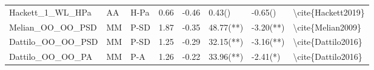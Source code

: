 \begin{tabular}{lllrrlll}
Hackett\_1\_WL\_HPa   &   AA &  H-Pa &              0.66 & -0.46 &                   0.43() &    -0.65() &    \textbackslash cite\{Hackett2019\} \\
Melian\_OO\_OO\_PSD   &   MM &  P-SD &              1.87 & -0.35 &                48.77(**) &  -3.20(**) &     \textbackslash cite\{Melian2009\} \\
Dattilo\_OO\_OO\_PSD  &   MM &  P-SD &              1.25 & -0.29 &                32.15(**) &  -3.16(**) &    \textbackslash cite\{Dattilo2016\} \\
Dattilo\_OO\_OO\_PA   &   MM &   P-A &              1.26 & -0.22 &                33.96(**) &   -2.41(*) &    \textbackslash cite\{Dattilo2016\} \\
\bottomrule
\end{tabular}

